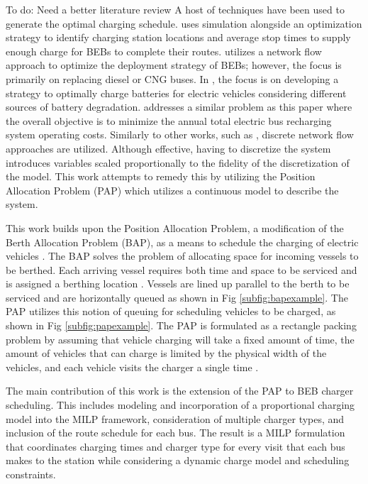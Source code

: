 \documentclass[utf8]{FrontiersinHarvard}
\newcommand{\TODO}[1]{{\color{green} To do: #1}}                                %
\begin{document}
\TODO{Need a better literature review} A host of techniques have been used to generate the optimal charging
schedule. \citep{Sebastiani2016} uses simulation alongside an optimization strategy to identify charging station locations and
average stop times to supply enough charge for BEBs to complete their routes. \citep{Wei2018} utilizes a network flow
approach to optimize the deployment strategy of BEBs; however, the focus is primarily on replacing diesel or CNG buses.
In \citep{Hoke2014}, the focus is on developing a strategy to optimally charge batteries for electric vehicles
considering different sources of battery degradation. \citep{Wang2017} addresses a similar problem as this paper where the overall objective is to minimize the
annual total electric bus recharging system operating costs. Similarly to other works, such as \citep{Wei2018}, discrete
network flow approaches are utilized. Although effective, having to discretize the system introduces variables scaled
proportionally to the fidelity of the discretization of the model. This work attempts to remedy this by utilizing the
Position Allocation Problem (PAP) which utilizes a continuous model to describe the system.

This work builds upon the Position Allocation Problem, a modification of the Berth Allocation Problem (BAP), as a means to schedule the charging of electric vehicles \citep{Qarebagh2019}. The BAP solves the problem of allocating space
for incoming vessels to be berthed. Each arriving vessel requires both time and space to be serviced and is assigned a
berthing location \citep{Imai2001}. Vessels are lined up parallel to the berth to be serviced and are horizontally queued
as shown in Fig \ref{subfig:bapexample}. The PAP utilizes this notion of queuing for scheduling vehicles
to be charged, as shown in Fig \ref{subfig:papexample}. The PAP is formulated as a rectangle packing problem by assuming that vehicle charging will take a fixed amount of time, the amount of vehicles that can charge is limited by the physical width of the vehicles, and each vehicle visits the charger a single time \citep{Qarebagh2019}.

The main contribution of this work is the extension of the PAP to BEB charger scheduling. This includes modeling and
incorporation of a proportional charging model into the MILP framework, consideration of multiple charger types, and
inclusion of the route schedule for each bus. The result is a MILP formulation that coordinates charging times and
charger type for every visit that each bus makes to the station while considering a dynamic charge model and scheduling
constraints.
\end{document}
